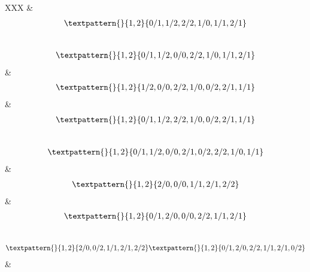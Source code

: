 \begin{center}
\begin{longtabu}[l]{XXX}
&
\begin{equation}
	\begin{gathered}
		\textpattern{}{1,2}{0/1,1/2,2/2,1/0,1/1,2/1}
	\end{gathered}
	\label{cls:184}
\end{equation}
\\
\begin{equation}
	\begin{gathered}
		\textpattern{}{1,2}{0/1,1/2,0/0,2/2,1/0,1/1,2/1}
	\end{gathered}
	\label{cls:185}
\end{equation}
&
\begin{equation}
	\begin{gathered}
		\textpattern{}{1,2}{1/2,0/0,2/2,1/0,0/2,2/1,1/1}
	\end{gathered}
	\label{cls:186}
\end{equation}
&
\begin{equation}
	\begin{gathered}
		\textpattern{}{1,2}{0/1,1/2,2/2,1/0,0/2,2/1,1/1}
	\end{gathered}
	\label{cls:187}
\end{equation}
\\
\begin{equation}
	\begin{gathered}
		\textpattern{}{1,2}{0/1,1/2,0/0,2/1,0/2,2/2,1/0,1/1}
	\end{gathered}
	\label{cls:188}
\end{equation}
&
\begin{equation}
	\begin{gathered}
		\textpattern{}{1,2}{2/0,0/0,1/1,2/1,2/2}
	\end{gathered}
	\label{cls:189}
\end{equation}
&
\begin{equation}
	\begin{gathered}
		\textpattern{}{1,2}{0/1,2/0,0/0,2/2,1/1,2/1}
	\end{gathered}
	\label{cls:190}
\end{equation}
\\
\begin{equation}
	\begin{gathered}
		\textpattern{}{1,2}{2/0,0/2,1/1,2/1,2/2}
		\textpattern{}{1,2}{0/1,2/0,2/2,1/1,2/1,0/2}
	\end{gathered}
	\label{cls:191}
\end{equation}
    &
\begin{equation}
	\begin{gathered}

\end{gathered}
\end{equation}
\end{longtabu}
\end{center}
